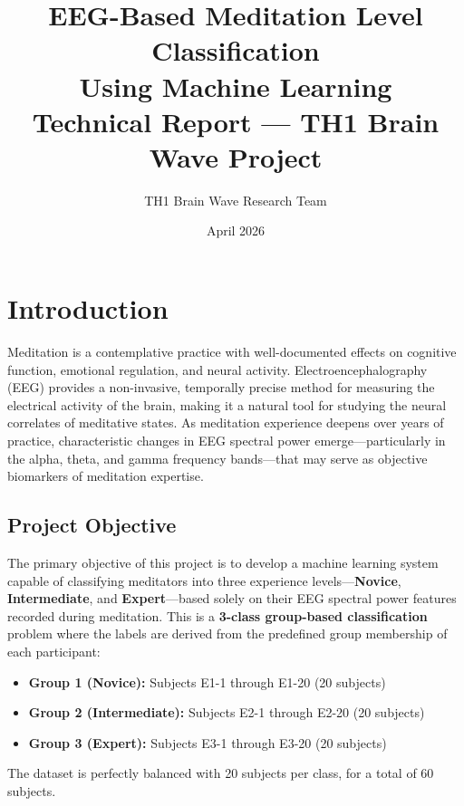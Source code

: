 \documentclass[12pt,a4paper]{article}
\title{\textbf{EEG-Based Meditation Level Classification\\Using Machine Learning}\\[0.5em]
\large Technical Report --- TH1 Brain Wave Project}
\author{TH1 Brain Wave Research Team}
\date{April 2026}
\begin{document}
\maketitle
\newpage
\tableofcontents
\newpage

\section{Introduction}
\label{sec:introduction}

Meditation is a contemplative practice with well-documented effects on cognitive function, emotional regulation, and neural activity. Electroencephalography (EEG) provides a non-invasive, temporally precise method for measuring the electrical activity of the brain, making it a natural tool for studying the neural correlates of meditative states. As meditation experience deepens over years of practice, characteristic changes in EEG spectral power emerge---particularly in the alpha, theta, and gamma frequency bands---that may serve as objective biomarkers of meditation expertise.

\subsection{Project Objective}

The primary objective of this project is to develop a machine learning system capable of classifying meditators into three experience levels---\textbf{Novice}, \textbf{Intermediate}, and \textbf{Expert}---based solely on their EEG spectral power features recorded during meditation. This is a \textbf{3-class group-based classification} problem where the labels are derived from the predefined group membership of each participant:

\begin{itemize}
  \item \textbf{Group 1 (Novice):} Subjects E1-1 through E1-20 (20 subjects)
  \item \textbf{Group 2 (Intermediate):} Subjects E2-1 through E2-20 (20 subjects)
  \item \textbf{Group 3 (Expert):} Subjects E3-1 through E3-20 (20 subjects)
\end{itemize}

The dataset is perfectly balanced with 20 subjects per class, for a total of 60 subjects.
\end{document}
